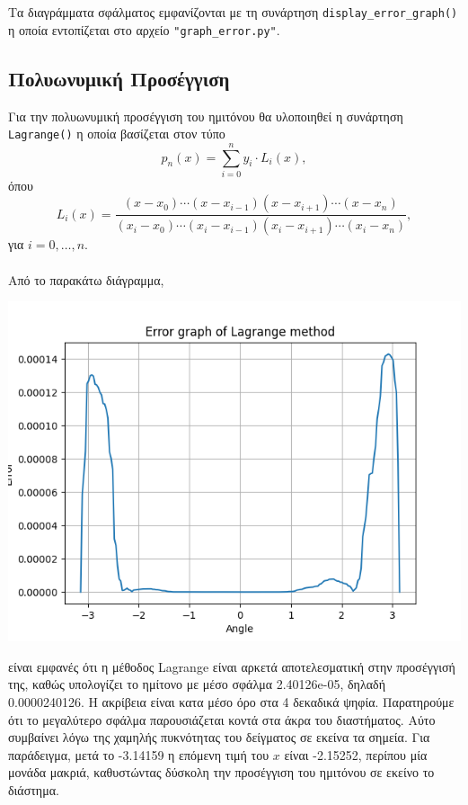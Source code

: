 \documentclass{article}
\begin{document}
Τα διαγράμματα σφάλματος εμφανίζονται με τη συνάρτηση \texttt{display\_error\_graph()} η οποία εντοπίζεται στο αρχείο \texttt{"graph\_error.py"}.

\subsection{Πολυωνυμική Προσέγγιση}
Για την πολυωνυμική προσέγγιση του ημιτόνου θα υλοποιηθεί η συνάρτηση \texttt{Lagrange()} η οποία βασίζεται στον τύπο 
\[
p_n(x) = \sum_{i=0}^{n} y_i \cdot L_i(x),
\]
όπου 
\[
L_i(x) = \frac{(x - x_0) \cdots (x - x_{i-1})(x - x_{i+1}) \cdots (x - x_n)}{(x_i - x_0) \cdots (x_i - x_{i-1})(x_i - x_{i+1}) \cdots (x_i - x_n)},
\]
για \( i = 0, \ldots, n \).\\\\
Από το παρακάτω διάγραμμα,
\begin{center}\includegraphics[width=\linewidth]{lagrange.png}\end{center}
είναι εμφανές ότι η μέθοδος Lagrange είναι αρκετά αποτελεσματική στην προσέγγισή της, καθώς υπολογίζει το ημίτονο με μέσο σφάλμα 2.40126e-05, δηλαδή 0.0000240126. Η ακρίβεια είναι κατα μέσο όρο στα 4 δεκαδικά ψηφία. Παρατηρούμε ότι το μεγαλύτερο σφάλμα παρουσιάζεται κοντά στα άκρα του διαστήματος. Αύτο συμβαίνει λόγω της χαμηλής πυκνότητας του δείγματος σε εκείνα τα σημεία. Για παράδειγμα, μετά το -3.14159 η επόμενη τιμή του \( x\) είναι -2.15252, περίπου μία μονάδα μακριά, καθυστώντας δύσκολη την προσέγγιση του ημιτόνου σε εκείνο το διάστημα.
\end{document}
